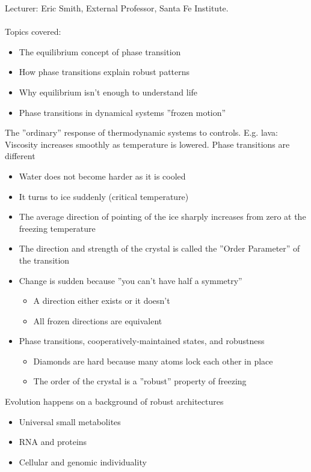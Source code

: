 \documentclass[]{article}
\begin{document}
Lecturer: Eric Smith, External Professor, Santa Fe Institute.\\
\\
Topics covered:
\begin{itemize}
	\item The equilibrium concept of phase transition
	
	\item How phase transitions explain robust patterns
	
	\item Why equilibrium isn’t enough to understand life
	\item Phase transitions in dynamical systems ''frozen motion''
\end{itemize}

The ''ordinary'' response of thermodynamic systems to controls. E.g. lava: Viscosity increases smoothly as temperature is lowered. Phase transitions are different
\begin{itemize}
	\item Water does not become harder as it is cooled
	\item It turns to ice suddenly (critical temperature)
	\item The average direction of pointing of the ice sharply increases from zero at the freezing temperature
	\item The direction and strength of the crystal is called the ''Order 	Parameter'' of the transition
	\item Change is sudden because ''you can’t have half a symmetry''
	\begin{itemize}
		\item A direction either exists or it doesn’t
		\item All frozen directions are equivalent
	\end{itemize}
	\item Phase transitions, cooperatively-maintained states, and robustness
	\begin{itemize}
		\item Diamonds are hard because many atoms lock each other in place
		\item The order of the crystal is a ''robust'' property of freezing
	\end{itemize}
\end{itemize}

Evolution happens on a background of robust architectures
\begin{itemize}
	\item Universal small metabolites
	\item RNA and proteins
	\item Cellular and genomic individuality
\end{itemize}
\end{document}
